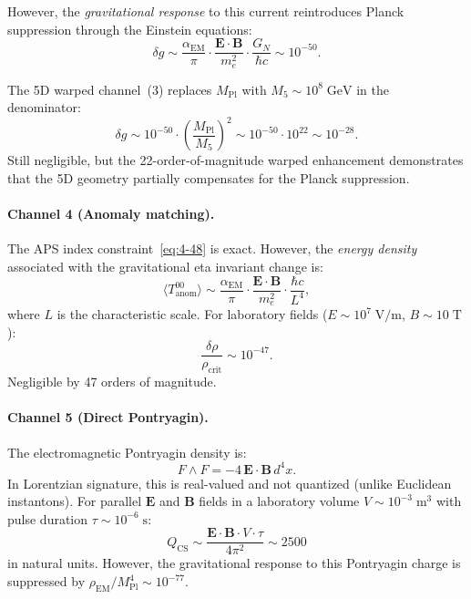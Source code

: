However, the \emph{gravitational response} to this current reintroduces Planck suppression through the Einstein equations:
\begin{equation}
  \delta g \sim \frac{\alpha_{\mathrm{EM}}}{\pi}
             \cdot \frac{\mathbf{E} \cdot \mathbf{B}}{m_e^2}
             \cdot \frac{G_N}{\hbar c}
  \sim 10^{-50}.
  \label{eq:4-56}
\end{equation}

The 5D warped channel~(3) replaces $M_{\mathrm{Pl}}$ with $M_5 \sim 10^8\;\mathrm{GeV}$ in the denominator:
\begin{equation}
  \delta g \sim 10^{-50} \cdot \left(\frac{M_{\mathrm{Pl}}}{M_5}\right)^2
  \sim 10^{-50} \cdot 10^{22} \sim 10^{-28}.
  \label{eq:4-57}
\end{equation}
Still negligible, but the 22-order-of-magnitude warped enhancement demonstrates that the 5D geometry partially compensates for the Planck suppression.

\paragraph{Channel 4 (Anomaly matching).}
The APS index constraint~\eqref{eq:4-48} is exact. However, the \emph{energy density} associated with the gravitational eta invariant change is:
\begin{equation}
  \langle T^{00}_{\mathrm{anom}} \rangle \sim \frac{\alpha_{\mathrm{EM}}}{\pi}
  \cdot \frac{\mathbf{E} \cdot \mathbf{B}}{m_e^2}
  \cdot \frac{\hbar c}{L^4},
  \label{eq:4-58}
\end{equation}
where $L$ is the characteristic scale. For laboratory fields ($E \sim 10^7\;\mathrm{V/m}$, $B \sim 10\;\mathrm{T}$):
\begin{equation}
  \frac{\delta\rho}{\rho_{\mathrm{crit}}} \sim 10^{-47}.
  \label{eq:4-59}
\end{equation}
Negligible by 47 orders of magnitude.

\paragraph{Channel 5 (Direct Pontryagin).}
The electromagnetic Pontryagin density is:
\begin{equation}
  F \wedge F = -4\, \mathbf{E} \cdot \mathbf{B}\, d^4x.
  \label{eq:4-60}
\end{equation}
In Lorentzian signature, this is real-valued and not quantized (unlike Euclidean instantons). For parallel $\mathbf{E}$ and $\mathbf{B}$ fields in a laboratory volume $V \sim 10^{-3}\;\mathrm{m}^3$ with pulse duration $\tau \sim 10^{-6}\;\mathrm{s}$:
\begin{equation}
  Q_{\mathrm{CS}} \sim \frac{\mathbf{E} \cdot \mathbf{B} \cdot V \cdot \tau}{4\pi^2}
  \sim 2500
  \label{eq:4-61}
\end{equation}
in natural units. However, the gravitational response to this Pontryagin charge is suppressed by $\rho_{\mathrm{EM}} / M_{\mathrm{Pl}}^4 \sim 10^{-77}$.


